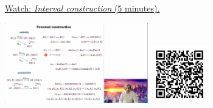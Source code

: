 
\begin{minipage}{10cm}
    \href{https://act4e-spring21.netlify.app/videos/spring2021-monads-a:monad-interval.html}{Watch: \emph{Interval construction} (5 minutes).}
        
    \href{https://act4e-spring21.netlify.app/videos/spring2021-monads-a:monad-interval.html}{\includegraphics[height=3.5cm]{spring2021-monads-a:monad-interval/thumbnails.jpg}}
    \href{https://act4e-spring21.netlify.app/videos/spring2021-monads-a:monad-interval.html}{\includegraphics[height=2.5cm]{spring2021-monads-a:monad-interval/qrcode.png}}
\end{minipage}
